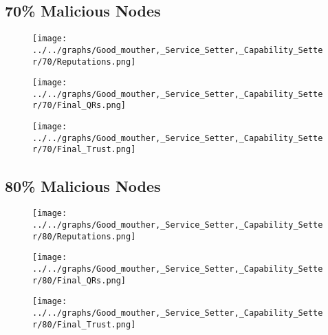 \begin{minipage}[t]{0.49\columnwidth}
\subsection*{70\% Malicious Nodes}
    \begin{figure}[H]
        \centering
        \texttt{[image: ../../graphs/Good\_mouther,\_Service\_Setter,\_Capability\_Setter/70/Reputations.png]}
    \end{figure}
    \begin{figure}[H]
        \centering
        \texttt{[image: ../../graphs/Good\_mouther,\_Service\_Setter,\_Capability\_Setter/70/Final\_QRs.png]}
    \end{figure}
\end{minipage}
\begin{minipage}[t]{0.49\columnwidth}
    \begin{figure}[H]
        \centering
        \texttt{[image: ../../graphs/Good\_mouther,\_Service\_Setter,\_Capability\_Setter/70/Final\_Trust.png]}
    \end{figure}
\end{minipage}

\begin{minipage}[t]{0.49\columnwidth}
\subsection*{80\% Malicious Nodes}
    \begin{figure}[H]
        \centering
        \texttt{[image: ../../graphs/Good\_mouther,\_Service\_Setter,\_Capability\_Setter/80/Reputations.png]}
    \end{figure}
    \begin{figure}[H]
        \centering
        \texttt{[image: ../../graphs/Good\_mouther,\_Service\_Setter,\_Capability\_Setter/80/Final\_QRs.png]}
    \end{figure}
\end{minipage}
\begin{minipage}[t]{0.49\columnwidth}
    \begin{figure}[H]
        \centering
        \texttt{[image: ../../graphs/Good\_mouther,\_Service\_Setter,\_Capability\_Setter/80/Final\_Trust.png]}
    \end{figure}
\end{minipage}

